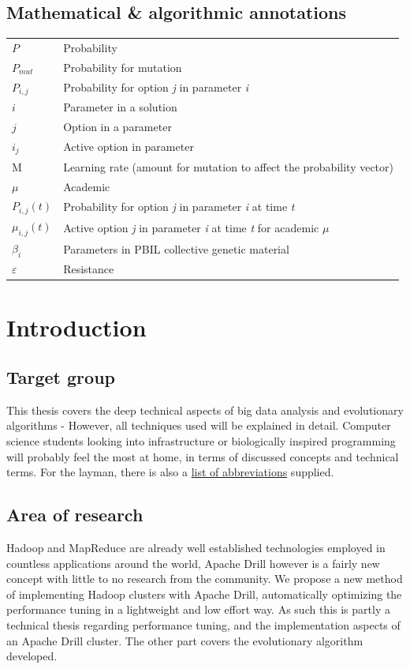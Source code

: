 \documentclass[a4paper,english]{report}
\begin{document}
	\section{Mathematical \& algorithmic annotations}
	\label{table:annotations}
	\begin{table}[H]
		\centering
		\begin{tabular}{ll}
			$P$	& Probability \\
			$P_{mut}$	& Probability for mutation \\
			$P_{i,j}$	& Probability for option \textit{j} in parameter \textit{i} \\
			$i$  & Parameter in a solution \\
			$j$ & Option in a parameter \\
			$i_{j}$ & Active option in parameter \\
			M & Learning rate (amount for mutation to affect the probability vector) \\
			$\mu$ & Academic \\
			$P_{i,j}(t)$ & Probability for option \textit{j} in parameter \textit{i} at time \textit{t} \\
			$\mu_{i,j}(t)$ & Active option \textit{j} in parameter \textit{i} at time \textit{t} for academic $\mu$ \\
			$\beta_{i}$ & Parameters in PBIL collective genetic material \\
			$\varepsilon$ & Resistance
			
		\end{tabular}
	\end{table}

	
	\chapter{Introduction}
		
		\section{Target group}
		This thesis covers the deep technical aspects of big data analysis and evolutionary algorithms - However, all techniques used will be explained in detail. Computer science students looking into infrastructure or biologically inspired programming will probably feel the most at home, in terms of discussed concepts and technical terms. For the layman, there is also a \hyperref[word_list]{list of abbreviations} supplied.
		
		\section{Area of research}
		Hadoop and MapReduce are already well established technologies employed in countless applications around the world, Apache Drill however is a fairly new concept with little to no research from the community. We propose a new method of implementing Hadoop clusters with Apache Drill, automatically optimizing the performance tuning in a lightweight and low effort way. As such this is partly a technical thesis regarding performance tuning, and the implementation aspects of an Apache Drill cluster. The other part covers the evolutionary algorithm developed.
		
\end{document}
